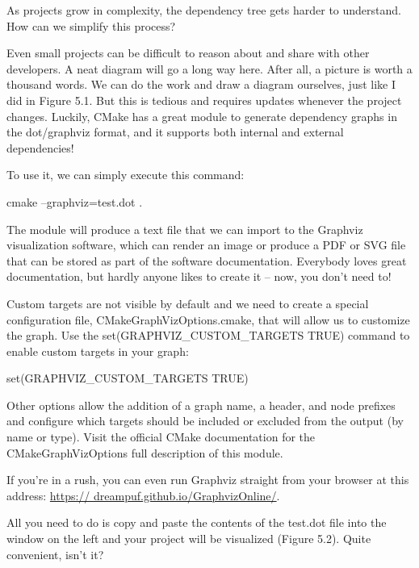 As projects grow in complexity, the dependency tree gets harder to understand. How can we simplify this process?


Even small projects can be difficult to reason about and share with other developers. A neat diagram will go a long way here. After all, a picture is worth a thousand words. We can do the work and draw a diagram ourselves, just like I did in Figure 5.1. But this is tedious and requires updates whenever the project changes. Luckily, CMake has a great module to generate dependency graphs in the dot/graphviz format, and it supports both internal and external dependencies!

To use it, we can simply execute this command:

\begin{shell}
cmake --graphviz=test.dot .
\end{shell}

The module will produce a text file that we can import to the Graphviz visualization software, which can render an image or produce a PDF or SVG file that can be stored as part of the software documentation. Everybody loves great documentation, but hardly anyone likes to create it – now, you don’t need to!

Custom targets are not visible by default and we need to create a special configuration file, CMakeGraphVizOptions.cmake, that will allow us to customize the graph. Use the set(GRAPHVIZ\_CUSTOM\_TARGETS TRUE) command to enable custom targets in your graph:


\begin{cmake}
set(GRAPHVIZ_CUSTOM_TARGETS TRUE)
\end{cmake}

Other options allow the addition of a graph name, a header, and node prefixes and configure which targets should be included or excluded from the output (by name or type). Visit the official CMake documentation for the CMakeGraphVizOptions full description of this module.

If you’re in a rush, you can even run Graphviz straight from your browser at this address: \url{https:// dreampuf.github.io/GraphvizOnline/}.

All you need to do is copy and paste the contents of the test.dot file into the window on the left and your project will be visualized (Figure 5.2). Quite convenient, isn’t it?

